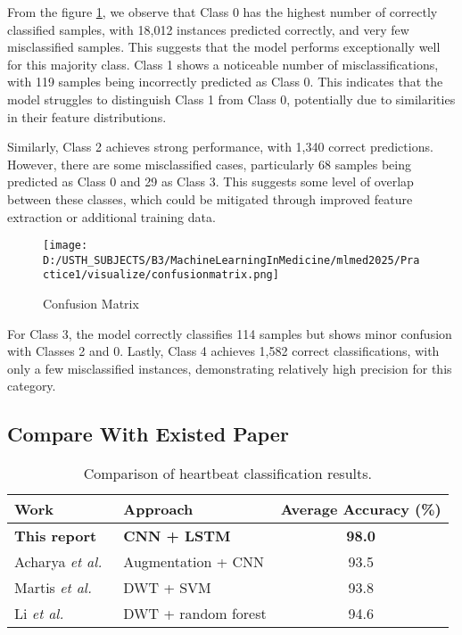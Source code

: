 \documentclass[10pt, conference]{IEEEtran}
\begin{document}
	From the figure \ref{fig:confusion_matrix}, we observe that Class 0 has the highest number of correctly classified samples, with 18,012 instances predicted correctly, and very few misclassified samples. This suggests that the model performs exceptionally well for this majority class. Class 1 shows a noticeable number of misclassifications, with 119 samples being incorrectly predicted as Class 0. This indicates that the model struggles to distinguish Class 1 from Class 0, potentially due to similarities in their feature distributions.
	
	Similarly, Class 2 achieves strong performance, with 1,340 correct predictions. However, there are some misclassified cases, particularly 68 samples being predicted as Class 0 and 29 as Class 3. This suggests some level of overlap between these classes, which could be mitigated through improved feature extraction or additional training data.
	
	\begin{figure}[H]
		\centering
		\texttt{[image: D:/USTH\_SUBJECTS/B3/MachineLearningInMedicine/mlmed2025/Practice1/visualize/confusionmatrix.png]}
		\caption{Confusion Matrix}
		\label{fig:confusion_matrix}
	\end{figure}
	
	For Class 3, the model correctly classifies 114 samples but shows minor confusion with Classes 2 and 0. Lastly, Class 4 achieves 1,582 correct classifications, with only a few misclassified instances, demonstrating relatively high precision for this category.	
		
	\subsection{Compare With Existed Paper}
		
	\begin{table}[h]
		\centering
		\begin{tabular}{|l|l|c|}
			\hline
			\textbf{Work} & \textbf{Approach} & \textbf{Average Accuracy (\%)} \\ 
			\hline
			\textbf{This report} & \textbf{CNN + LSTM} & \textbf{98.0} \\ 
			Acharya \textit{et al.}~\cite{acharya2017} & Augmentation + CNN & 93.5 \\ 
			Martis \textit{et al.}~\cite{martis2013} & DWT + SVM & 93.8 \\ 
			Li \textit{et al.}~\cite{li2016} & DWT + random forest & 94.6 \\ 
			\hline
		\end{tabular}
		\caption{Comparison of heartbeat classification results.}
		\label{tab:heartbeat_comparison}
	\end{table}
	
\end{document}

